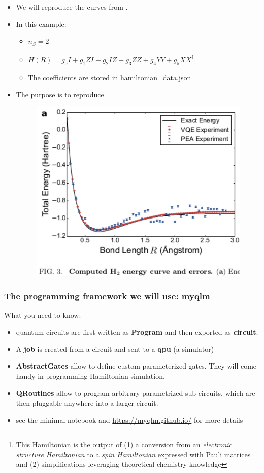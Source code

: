 \documentclass{beamer}
\begin{document}
\begin{frame}
\begin{itemize}
\item We will reproduce the curves from \textcolor{blue}{\cite{o2016scalable}}.
\item In this example: 
    \begin{itemize}
    \item $n_{S}=2$
    \item $H(R) = g_{0}I+g_{1}ZI+g_{2}IZ+g_{3}ZZ+g_{4}YY+g_{5}XX$\footnote{This Hamiltonian is the output of (1) a conversion from an \emph{electronic structure Hamiltonian} to a \emph{spin Hamiltonian} expressed with Pauli matrices and (2) simplifications leveraging theoretical chemistry knowledge}
    \item The coefficients are stored in {\selectfont hamiltonian\_data.json}
    \end{itemize}
\item The purpose is to reproduce
\begin{center}
\begin{figure}
\includegraphics[width=.5\textwidth]{dissociation_curve.eps}
\end{figure}
\end{center}
\end{itemize}
\end{frame}

\begin{frame}
\frametitle{The programming framework we will use: myqlm}

What you need to know:
\begin{itemize}
\item quantum circuits are first written as \textbf{Program} and then exported as \textbf{circuit}.
\item A \textbf{job} is created from a circuit and sent to a \textbf{qpu} (a simulator)
\item \textbf{AbstractGates} allow to define custom parameterized gates. They will come handy in programming Hamiltonian simulation.
\item \textbf{QRoutines} allow to program arbitrary parametrized sub-circuits, which are then pluggable anywhere into a larger circuit.
\item see the minimal notebook and \textcolor{blue}{\href{https://myqlm.github.io/}{https://myqlm.github.io/}} for more details
\end{itemize}

\end{frame}



\end{document}
